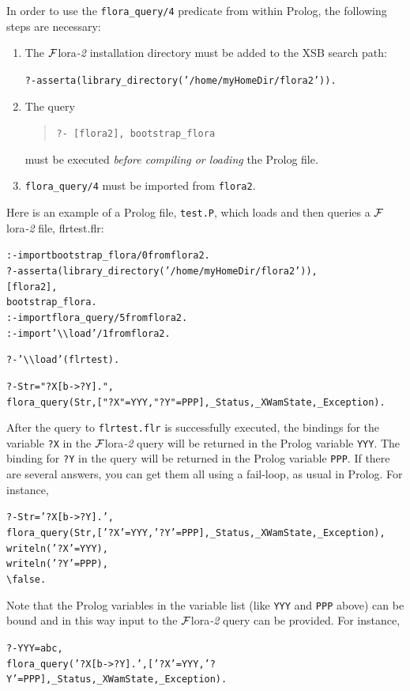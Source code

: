 \documentclass[11pt]{article}
\newcommand{\FLORA}{{\mbox{\sc ${\cal F}${lora}\rm\emph{-2}}}\xspace}
\newcommand{\FLSYSTEM}{\FLORA}
\newcommand{\FLBOOTSTRAP}{bootstrap\_flora}
\newcommand{\FLQUERYCMD}{flora\_query}
\newcommand{\ENGINENAME}{flora2}
\newcommand{\flrext}{flr\xspace}
\newcommand{\bs}{\textbackslash}
\begin{document}
In order to use the {\tt flora\_query/4} predicate from within Prolog,
the following steps are necessary:
\begin{enumerate}
  \item The \FLSYSTEM installation directory must be added to
    the XSB search path:
\begin{alltt}
 ?- asserta(library_directory('/home/myHomeDir/\ENGINENAME')).  
\end{alltt}
  \item The query
    \begin{quote}
      {\tt ?- [flora2], \FLBOOTSTRAP} 
    \end{quote}
    must be executed \emph{before compiling or loading} the Prolog file.
  \item {\tt flora\_query/4} must be imported from {\tt flora2}.  
\end{enumerate}
Here is an example of a Prolog file, {\tt test.P}, which loads and then
queries a \FLSYSTEM file, flrtest.\flrext:
\begin{alltt}
:- import \FLBOOTSTRAP/0 from flora2.
?- asserta(library_directory('/home/myHomeDir/\ENGINENAME')),
   [flora2],
   \FLBOOTSTRAP. 
:- import \FLQUERYCMD/5 from flora2.
:- import '\bs{}\bs{}load'/1 from flora2.

?- '\bs{}\bs{}load'(flrtest).  

?- Str="?X[b->?Y].",
   \FLQUERYCMD(Str,["?X"=YYY,"?Y"=PPP], _Status,_XWamState,_Exception).
\end{alltt}
After the query to {\tt flrtest.\flrext} is successfully executed, the bindings
for the variable {\tt ?X} in the \FLSYSTEM query will be returned in the Prolog
variable {\tt YYY}. The binding  for {\tt ?Y} in the query will be returned in the
Prolog variable {\tt PPP}. If there are several answers, you can get them
all using a fail-loop, as usual in Prolog. For instance, 
\begin{alltt}
?- Str='?X[b->?Y].',
   \FLQUERYCMD(Str,['?X'=YYY,'?Y'=PPP], _Status,_XWamState,_Exception),
   writeln('?X' = YYY),
   writeln('?Y' = PPP),
   \bs{}false.
\end{alltt}
Note that the Prolog variables in the variable list (like {\tt YYY} and
{\tt PPP} above) can be bound and in this way input to the \FLSYSTEM query  
can be provided. For instance, 
\begin{alltt}
?- YYY=abc,
   \FLQUERYCMD('?X[b->?Y].',['?X'=YYY,'?Y'=PPP],_Status,_XWamState,_Exception).
\end{alltt}
\end{document}
